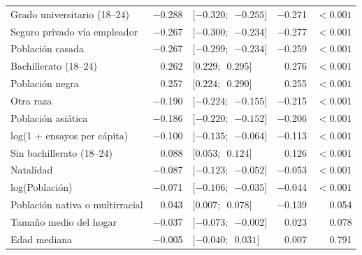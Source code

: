 {\begin{xltabular}{\linewidth}{>{\raggedright\arraybackslash}X r l r r}
Grado universitario (18–24) & \num{-0.288} & $[\num{-0.320};$\allowbreak\ $\num{-0.255}]$ & \num{-0.271} & $<\num{0.001}$ \\
Seguro privado vía empleador & \num{-0.267} & $[\num{-0.300};$\allowbreak\ $\num{-0.234}]$ & \num{-0.277} & $<\num{0.001}$ \\
Población casada & \num{-0.267} & $[\num{-0.299};$\allowbreak\ $\num{-0.234}]$ & \num{-0.259} & $<\num{0.001}$ \\
Bachillerato (18–24) & \num{0.262} & $[\num{0.229};$\allowbreak\ $\num{0.295}]$ & \num{0.276} & $<\num{0.001}$ \\
Población negra & \num{0.257} & $[\num{0.224};$\allowbreak\ $\num{0.290}]$ & \num{0.255} & $<\num{0.001}$ \\
Otra raza & \num{-0.190} & $[\num{-0.224};$\allowbreak\ $\num{-0.155}]$ & \num{-0.215} & $<\num{0.001}$ \\
Población asiática & \num{-0.186} & $[\num{-0.220};$\allowbreak\ $\num{-0.152}]$ & \num{-0.206} & $<\num{0.001}$ \\
log(1 + ensayos per cápita) & \num{-0.100} & $[\num{-0.135};$\allowbreak\ $\num{-0.064}]$ & \num{-0.113} & $<\num{0.001}$ \\
Sin bachillerato (18–24) & \num{0.088} & $[\num{0.053};$\allowbreak\ $\num{0.124}]$ & \num{0.126} & $<\num{0.001}$ \\
Natalidad & \num{-0.087} & $[\num{-0.123};$\allowbreak\ $\num{-0.052}]$ & \num{-0.053} & $<\num{0.001}$ \\
log(Población) & \num{-0.071} & $[\num{-0.106};$\allowbreak\ $\num{-0.035}]$ & \num{-0.044} & $<\num{0.001}$ \\
Población nativa o multirracial & \num{0.043} & $[\num{0.007};$\allowbreak\ $\num{0.078}]$ & \num{-0.139} & \num{0.054} \\
Tamaño medio del hogar & \num{-0.037} & $[\num{-0.073};$\allowbreak\ $\num{-0.002}]$ & \num{0.023} & \num{0.078} \\
Edad mediana & \num{-0.005} & $[\num{-0.040};$\allowbreak\ $\num{0.031}]$ & \num{0.007} & \num{0.791} \\
\end{xltabular}
}
